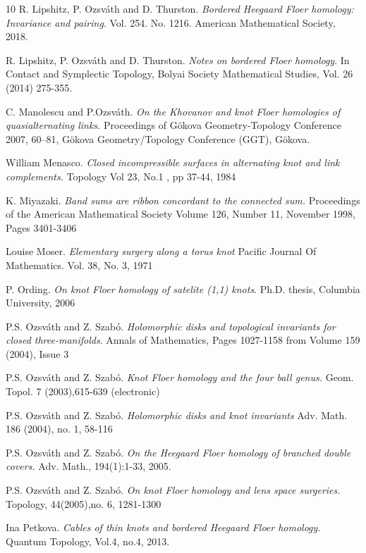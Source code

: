 \documentclass[11pt,reqno]{amsart}
\theoremstyle{definition}
\newtheorem *{remark}{Remark}
\begin{document}
\begin{thebibliography}{10}
R. Lipshitz, P. Ozsv\'ath and D. Thurston.
\textit{Bordered Heegaard Floer homology: Invariance and pairing}.
 Vol. 254. No. 1216. American Mathematical Society, 2018.

R. Lipshitz, P. Ozsv\'ath and D. Thurston. 
\textit{Notes on bordered Floer homology}.
In Contact and Symplectic Topology, Bolyai Society Mathematical Studies, Vol. 26 (2014) 275-355.

C. Manolescu and P.Ozsv\'ath.
\textit{On the Khovanov and knot Floer homologies of quasialternating links.}
 Proceedings of G\"okova Geometry-Topology Conference 2007, 60--81, G\"okova Geometry/Topology Conference (GGT), G\"okova.

William Menasco.
\textit{Closed incompressible surfaces in alternating knot and link complements.}
Topology Vol 23, No.1 , pp 37-44, 1984

K. Miyazaki.
\textit{Band sums are ribbon concordant to the connected sum.}
Proceedings of the American Mathematical Society
Volume 126, Number 11, November 1998, Pages 3401-3406

Louise Moser.
\textit{Elementary surgery along a torus knot}
Pacific Journal Of Mathematics. Vol. 38, No. 3, 1971

P. Ording.
\textit{On knot Floer homology of satelite (1,1) knots}.
Ph.D. thesis, Columbia University, 2006

P.S. Ozsv\'ath and Z. Szab\'o.
\textit{Holomorphic disks and topological invariants for closed three-manifolds}.
Annals of Mathematics, Pages 1027-1158 from Volume 159 (2004), Issue 3 

P.S. Ozsv\'ath and Z. Szab\'o.
\textit{Knot Floer homology and the four ball genus.}
Geom. Topol. 7 (2003),615-639 (electronic)

P.S. Ozsv\'ath and Z. Szab\'o.
\textit{Holomorphic disks and knot invariants}
Adv. Math. 186 (2004), no. 1, 58-116 

P.S. Ozsv\'ath and Z. Szab\'o.
\textit{On the Heegaard Floer homology of branched double covers.}
Adv. Math., 194(1):1-33, 2005.

P.S. Ozsv\'ath and Z. Szab\'o.
\textit{On knot Floer homology and lens space surgeries.}
Topology, 44(2005),no. 6, 1281-1300


Ina Petkova.
\textit{Cables of thin knots and bordered Heegaard Floer homology.}
Quantum Topology, Vol.4, no.4, 2013.


\end{thebibliography}
\end{document}

